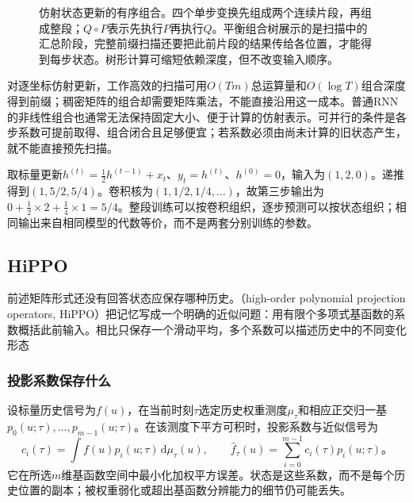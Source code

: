 \begin{figure}[htb]
  \centering
  
  \caption{仿射状态更新的有序组合。四个单步变换先组成两个连续片段，再组成整段；$Q\circ P$表示先执行$P$再执行$Q$。平衡组合树展示的是扫描中的汇总阶段，完整前缀扫描还要把此前片段的结果传给各位置，才能得到每步状态。树形计算可缩短依赖深度，但不改变输入顺序。}
  \label{fig:rnn-scan}
\end{figure}

对逐坐标仿射更新，工作高效的扫描可用$O(Tm)$总运算量和$O(\log T)$组合深度得到前缀；稠密矩阵的组合却需要矩阵乘法，不能直接沿用这一成本。普通RNN的非线性组合也通常无法保持固定大小、便于计算的仿射表示。可并行的条件是各步系数可提前取得、组合闭合且足够便宜；若系数必须由尚未计算的旧状态产生，就不能直接预先扫描。

\begin{example}[同一状态模型的递推与卷积]
  \label{ex:rnn-ssm-equivalence}
  取标量更新$h^{(t)}=\tfrac12 h^{(t-1)}+x_t$、$y_t=h^{(t)}$、$h^{(0)}=0$，输入为$(1,2,0)$。递推得到$(1,5/2,5/4)$。卷积核为$(1,1/2,1/4,\ldots)$，故第三步输出为$0+\tfrac12\times2+\tfrac14\times1=5/4$。整段训练可以按卷积组织，逐步预测可以按状态组织；相同输出来自相同模型的代数等价，而不是两套分别训练的参数。
\end{example}

\subsection{HiPPO}
\label{sec:rnn-hippo}

前述矩阵形式还没有回答状态应保存哪种历史。（high-order polynomial projection operators, HiPPO）把记忆写成一个明确的近似问题：用有限个多项式基函数的系数概括此前输入。相比只保存一个滑动平均，多个系数可以描述历史中的不同变化形态

\subsubsection{投影系数保存什么}
\label{sec:rnn-hippo-memory}

设标量历史信号为$f(u)$，在当前时刻$\tau$选定历史权重测度$\mu_\tau$和相应正交归一基$p_0(u;\tau),\ldots,p_{m-1}(u;\tau)$。在该测度下平方可积时，投影系数与近似信号为
\begin{equation}
  c_i(\tau)=\int f(u)p_i(u;\tau)\,\mathrm{d}\mu_\tau(u),
  \qquad
  \widehat f_\tau(u)=\sum_{i=0}^{m-1}c_i(\tau)p_i(u;\tau)\text{。}
  \label{eq:rnn-hippo-projection}
\end{equation}
它在所选$m$维基函数空间中最小化加权平方误差。状态是这些系数，而不是每个历史位置的副本；被权重弱化或超出基函数分辨能力的细节仍可能丢失。

